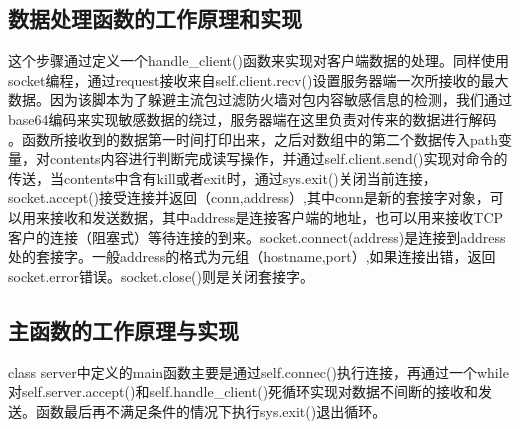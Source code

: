 \subsection{数据处理函数的工作原理和实现}
这个步骤通过定义一个handle\_client()函数来实现对客户端数据的处理。同样使用socket编程，通过request接收来自self.client.recv()设置服务器端一次所接收的最大数据。因为该脚本为了躲避主流包过滤防火墙对包内容敏感信息的检测，我们通过base64编码来实现敏感数据的绕过，服务器端在这里负责对传来的数据进行解码\cite{11} 。函数所接收到的数据第一时间打印出来，之后对数组中的第二个数据传入path变量，对contents内容进行判断完成读写操作，并通过self.client.send()实现对命令的传送，当contents中含有kill或者exit时，通过sys.exit()关闭当前连接，socket.accept()接受连接并返回（conn,address）,其中conn是新的套接字对象，可以用来接收和发送数据，其中address是连接客户端的地址，也可以用来接收TCP 客户的连接（阻塞式）等待连接的到来。socket.connect(address)是连接到address处的套接字。一般address的格式为元组（hostname,port）,如果连接出错，返回socket.error错误。socket.close()则是关闭套接字。
\subsection{主函数的工作原理与实现}
class server中定义的main函数主要是通过self.connec()执行连接，再通过一个while 对self.server.accept()和self.handle\_client()死循环实现对数据不间断的接收和发送。函数最后再不满足条件的情况下执行sys.exit()退出循环。

